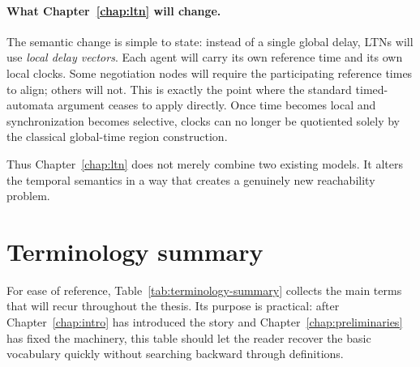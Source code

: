 \paragraph{What Chapter~\ref{chap:ltn} will change.}
The semantic change is simple to state: instead of a single global delay, LTNs will use \emph{local delay vectors}. Each agent will carry its own reference time and its own local clocks. Some negotiation nodes will require the participating reference times to align; others will not. This is exactly the point where the standard timed-automata argument ceases to apply directly. Once time becomes local and synchronization becomes selective, clocks can no longer be quotiented solely by the classical global-time region construction.

Thus Chapter~\ref{chap:ltn} does not merely combine two existing models. It alters the temporal semantics in a way that creates a genuinely new reachability problem.


\section{Terminology summary}
\label{sec:prelim-terminology}

For ease of reference, Table~\ref{tab:terminology-summary} collects the main terms that will recur throughout the thesis. Its purpose is practical: after Chapter~\ref{chap:intro} has introduced the story and Chapter~\ref{chap:preliminaries} has fixed the machinery, this table should let the reader recover the basic vocabulary quickly without searching backward through definitions.

